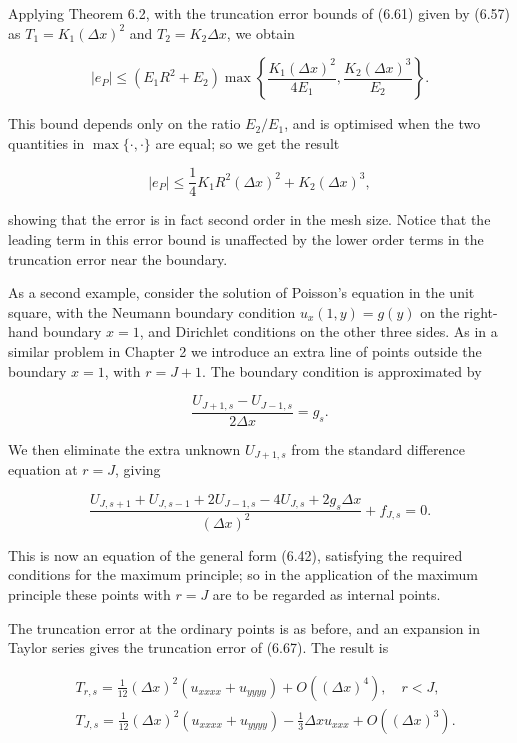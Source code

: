 \documentclass[10pt]{article}
\begin{document}
Applying Theorem 6.2, with the truncation error bounds of (6.61) given by (6.57) as \(T_{1}=K_{1}(\Delta x)^{2}\) and \(T_{2}=K_{2} \Delta x\), we obtain

\[
\left|e_{P}\right| \leq\left(E_{1} R^{2}+E_{2}\right) \max \left\{\frac{K_{1}(\Delta x)^{2}}{4 E_{1}}, \frac{K_{2}(\Delta x)^{3}}{E_{2}}\right\} .
\]

This bound depends only on the ratio \(E_{2} / E_{1}\), and is optimised when the two quantities in \(\max \{\cdot, \cdot\}\) are equal; so we get the result

\[
\left|e_{P}\right| \leq \frac{1}{4} K_{1} R^{2}(\Delta x)^{2}+K_{2}(\Delta x)^{3},
\]

showing that the error is in fact second order in the mesh size. Notice that the leading term in this error bound is unaffected by the lower order terms in the truncation error near the boundary.

As a second example, consider the solution of Poisson's equation in the unit square, with the Neumann boundary condition \(u_{x}(1, y)=g(y)\) on the right-hand boundary \(x=1\), and Dirichlet conditions on the other three sides. As in a similar problem in Chapter 2 we introduce an extra line of points outside the boundary \(x=1\), with \(r=J+1\). The boundary condition is approximated by

\[
\frac{U_{J+1, s}-U_{J-1, s}}{2 \Delta x}=g_{s} .
\]

We then eliminate the extra unknown \(U_{J+1, s}\) from the standard difference equation at \(r=J\), giving

\[
\frac{U_{J, s+1}+U_{J, s-1}+2 U_{J-1, s}-4 U_{J, s}+2 g_{s} \Delta x}{(\Delta x)^{2}}+f_{J, s}=0 .
\]

This is now an equation of the general form (6.42), satisfying the required conditions for the maximum principle; so in the application of the maximum principle these points with \(r=J\) are to be regarded as internal points.

The truncation error at the ordinary points is as before, and an expansion in Taylor series gives the truncation error of (6.67). The result is

\[
\begin{aligned}
& T_{r, s}=\frac{1}{12}(\Delta x)^{2}\left(u_{x x x x}+u_{y y y y}\right)+O\left((\Delta x)^{4}\right), \quad r<J, \\
& T_{J, s}=\frac{1}{12}(\Delta x)^{2}\left(u_{x x x x}+u_{y y y y}\right)-\frac{1}{3} \Delta x u_{x x x}+O\left((\Delta x)^{3}\right) .
\end{aligned}
\]
\end{document}
